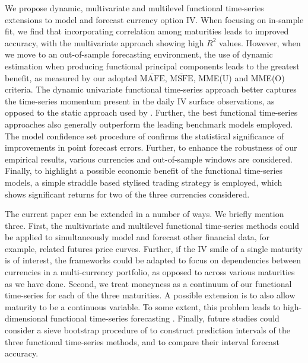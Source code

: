 \documentclass[12pt,a4paper]{article}
\begin{document}
We propose dynamic, multivariate and multilevel functional time-series extensions to model and forecast currency option IV. When focusing on in-sample fit, we find that incorporating correlation among maturities leads to improved accuracy, with the multivariate approach showing high $R^2$ values. However, when we move to an out-of-sample forecasting environment, the use of dynamic estimation when producing functional principal components leads to the greatest benefit, as measured by our adopted $\overline{\text{MAFE}}$, $\overline{\text{MSFE}}$, MME(U) and MME(O) criteria. The dynamic univariate functional time-series approach better captures the time-series momentum present in the daily IV surface observations, as opposed to the static approach used by \cite{KCM18}. Further, the best functional time-series approaches also generally outperform the leading benchmark models employed. The model confidence set procedure of \cite{HLN11} confirms the statistical significance of improvements in point forecast errors. Further, to enhance the robustness of our empirical results, various currencies and out-of-sample windows are considered. Finally, to highlight a possible economic benefit of the functional time-series models, a simple straddle based stylised trading strategy is employed, which shows significant returns for two of the three currencies considered.

The current paper can be extended in a number of ways. We briefly mention three. First, the multivariate and multilevel functional time-series methods could be applied to simultaneously model and forecast other financial data, for example, related futures price curves. Further, if the IV smile of a single maturity is of interest, the frameworks could be adapted to focus on dependencies between currencies in a multi-currency portfolio, as opposed to across various maturities as we have done. Second, we treat moneyness as a continuum of our functional time-series for each of the three maturities. A possible extension is to also allow maturity to be a continuous variable. To some extent, this problem leads to high-dimensional functional time-series forecasting \citep[see, e.g.,][]{GSY19, TNH20, CCQ20}. Finally, future studies could consider a sieve bootstrap procedure of \cite{PS20} to construct prediction intervals of the three functional time-series methods, and to compare their interval forecast accuracy.





\end{document}
